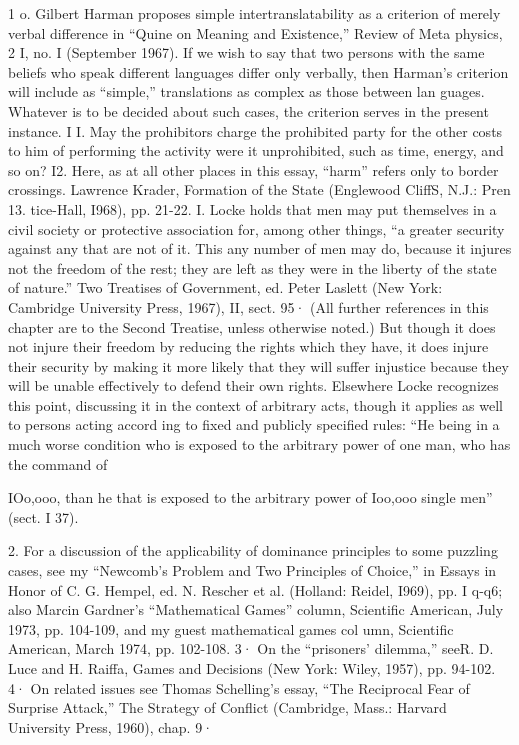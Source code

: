 \documentclass[11pt,openany]{book}
\begin{document}
{1 o. Gilbert Harman proposes simple intertranslatability as a criterion of merely verbal difference in ``Quine on Meaning and Existence,'' Review of Meta physics, 2 I, no. I (September 1967). If we wish to say that two persons with the same beliefs who speak different languages differ only verbally, then Harman's criterion will include as ``simple,'' translations as complex as those between lan guages. Whatever is to be decided about such cases, the criterion serves in the present instance. I I. May the prohibitors charge the prohibited party for the other costs to him of performing the activity were it unprohibited, such as time, energy, and so on? I2. Here, as at all other places in this essay, ``harm'' refers only to border crossings. Lawrence Krader, Formation of the State (Englewood CliffS, N.J.: Pren 13. tice-Hall, I968), pp. 21-22. I. Locke holds that men may put themselves in a civil society or protective association for, among other things, ``a greater security against any that are not of it. This any number of men may do, because it injures not the freedom of the rest; they are left as they were in the liberty of the state of nature.'' Two Treatises of Government, ed. Peter Laslett (New York: Cambridge University Press, 1967), II, sect. 95· (All further references in this chapter are to the Second Treatise, unless otherwise noted.) But though it does not injure their freedom by reducing the rights which they have, it does injure their security by making it more likely that they will suffer injustice because they will be unable effectively to defend their own rights. Elsewhere Locke recognizes this point, discussing it in the context of arbitrary acts, though it applies as well to persons acting accord ing to fixed and publicly specified rules: ``He being in a much worse condition who is exposed to the arbitrary power of one man, who has the command of\par

IOo,ooo, than he that is exposed to the arbitrary power of Ioo,ooo single men'' (sect. I 37).\par

2. For a discussion of the applicability of dominance principles to some puzzling cases, see my ``Newcomb's Problem and Two Principles of Choice,'' in Essays in Honor of C. G. Hempel, ed. N. Rescher et al. (Holland: Reidel, I969), pp. I q-q6; also Marcin Gardner's ``Mathematical Games'' column, Scientific American, July 1973, pp. 104-109, and my guest mathematical games col umn, Scientific American, March 1974, pp. 102-108. 3· On the ``prisoners' dilemma,'' seeR. D. Luce and H. Raiffa, Games and Decisions (New York: Wiley, 1957), pp. 94-102. 4· On related issues see Thomas Schelling's essay, ``The Reciprocal Fear of Surprise Attack,'' The Strategy of Conflict (Cambridge, Mass.: Harvard University Press, 1960), chap. 9·\par

}
\end{document}
